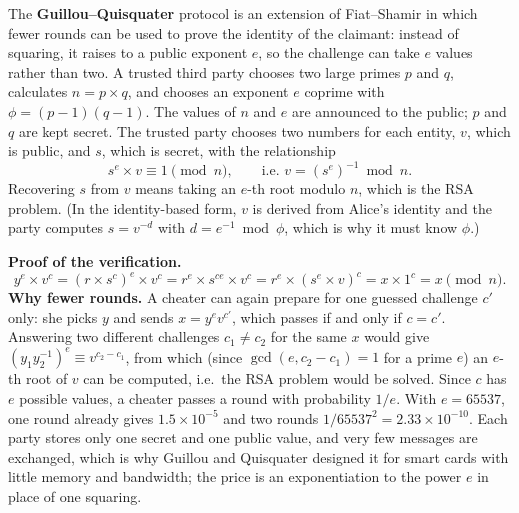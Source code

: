 The \textbf{Guillou--Quisquater} protocol is an extension of Fiat--Shamir in which fewer rounds can be used to prove the identity of the claimant: instead of squaring, it raises to a public exponent $e$, so the challenge can take $e$ values rather than two. A trusted third party chooses two large primes $p$ and $q$, calculates $n = p \times q$, and chooses an exponent $e$ coprime with $\phi = (p - 1)(q - 1)$. The values of $n$ and $e$ are announced to the public; $p$ and $q$ are kept secret. The trusted party chooses two numbers for each entity, $v$, which is public, and $s$, which is secret, with the relationship
\[
s^e \times v \equiv 1 \pmod n , \qquad \text{i.e.\ } v = (s^e)^{-1} \bmod n .
\]
Recovering $s$ from $v$ means taking an $e$-th root modulo $n$, which is the RSA problem. (In the identity-based form, $v$ is derived from Alice's identity and the party computes $s = v^{-d}$ with $d = e^{-1} \bmod \phi$, which is why it must know $\phi$.)
\begin{center}
\end{center}
\textbf{Proof of the verification.}
\[
y^e \times v^c = (r \times s^c)^e \times v^c = r^e \times s^{ce} \times v^c = r^e \times (s^e \times v)^c = x \times 1^c = x \pmod n .
\]
\textbf{Why fewer rounds.} A cheater can again prepare for one guessed challenge $c'$ only: she picks $y$ and sends $x = y^e v^{c'}$, which passes if and only if $c = c'$. Answering two different challenges $c_1 \ne c_2$ for the same $x$ would give $(y_1 y_2^{-1})^e \equiv v^{c_2 - c_1}$, from which (since $\gcd(e, c_2 - c_1) = 1$ for a prime $e$) an $e$-th root of $v$ can be computed, i.e.\ the RSA problem would be solved. Since $c$ has $e$ possible values, a cheater passes a round with probability $1/e$. With $e = 65537$, one round already gives $1.5 \times 10^{-5}$ and two rounds $1/65537^2 = 2.33 \times 10^{-10}$. Each party stores only one secret and one public value, and very few messages are exchanged, which is why Guillou and Quisquater designed it for smart cards with little memory and bandwidth; the price is an exponentiation to the power $e$ in place of one squaring.

